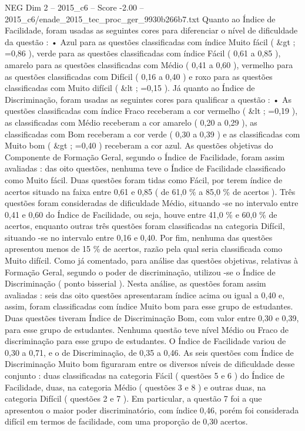 \begin{textsample}{NEG Dim 2 – 2015\_c6 – Score -2.00 – 2015\_c6/enade\_2015\_tec\_proc\_ger\_9930b266b7.txt}
Quanto ao Índice de Facilidade, foram usadas as seguintes cores para diferenciar o nível de dificuldade da questão : • Azul para as questões classificadas com índice Muito fácil ( \&gt ; =0,86 ), verde para as questões classificadas com índice Fácil ( 0,61 a 0,85 ), amarelo para as questões classificadas com Médio ( 0,41 a 0,60 ), vermelho para as questões classificadas com Difícil ( 0,16 a 0,40 ) e roxo para as questões classificadas com Muito difícil ( \&lt ; =0,15 ).
Já quanto ao Índice de Discriminação, foram usadas as seguintes cores para qualificar a questão : • As questões classificadas com índice Fraco receberam a cor vermelho ( \&lt ; =0,19 ), as classificadas com Médio receberam a cor amarelo ( 0,20 a 0,29 ), as classificadas com Bom receberam a cor verde ( 0,30 a 0,39 ) e as classificadas com Muito bom ( \&gt ; =0,40 ) receberam a cor azul.
As questões objetivas do Componente de Formação Geral, segundo o Índice de Facilidade, foram assim avaliadas : das oito questões, nenhuma teve o Índice de Facilidade classificado como Muito fácil.
Duas questões foram tidas como Fácil, por terem índice de acertos situado na faixa entre 0,61 e 0,85 ( de 61,0 \% a 85,0 \% de acertos ).
Três questões foram consideradas de dificuldade Médio, situando -se no intervalo entre 0,41 e 0,60 do Índice de Facilidade, ou seja, houve entre 41,0 \% e 60,0 \% de acertos, enquanto outras três questões foram classificadas na categoria Difícil, situando -se no intervalo entre 0,16 e 0,40.
Por fim, nenhuma das questões apresentou menos de 15 \% de acertos, razão pela qual seria classificada como Muito difícil.
Como já comentado, para análise das questões objetivas, relativas à Formação Geral, segundo o poder de discriminação, utilizou -se o Índice de Discriminação ( ponto bisserial ).
Nesta análise, as questões foram assim avaliadas : seis das oito questões apresentaram índice acima ou igual a 0,40 e, assim, foram classificadas com índice Muito bom para esse grupo de estudantes.
Duas questões tiveram Índice de Discriminação Bom, com valor entre 0,30 e 0,39, para esse grupo de estudantes.
Nenhuma questão teve nível Médio ou Fraco de discriminação para esse grupo de estudantes.
O Índice de Facilidade variou de 0,30 a 0,71, e o de Discriminação, de 0,35 a 0,46.
As seis questões com Índice de Discriminação Muito bom figuraram entre os diversos níveis de dificuldade desse conjunto : duas classificadas na categoria Fácil ( questões 5 e 6 ) do Índice de Facilidade, duas, na categoria Médio ( questões 3 e 8 ) e outras duas, na categoria Difícil ( questões 2 e 7 ).
Em particular, a questão 7 foi a que apresentou o maior poder discriminatório, com índice 0,46, porém foi considerada difícil em termos de facilidade, com uma proporção de 0,30 acertos.

\end{textsample}
